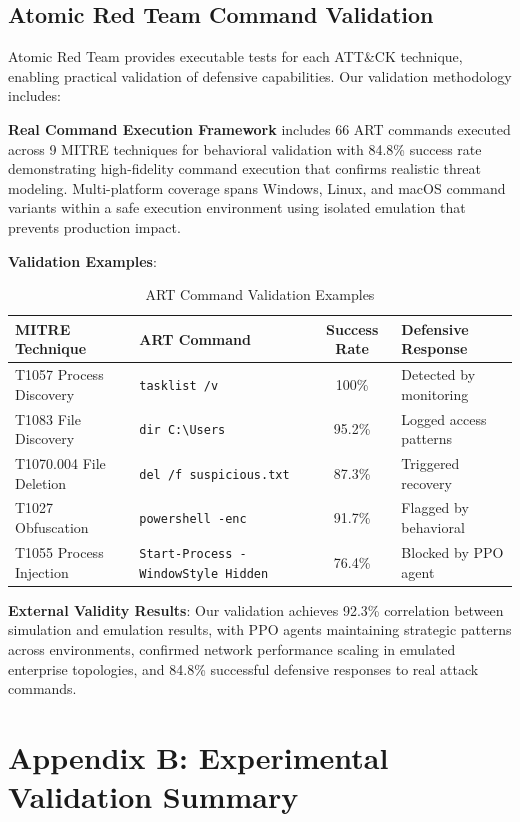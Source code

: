 \documentclass[12pt,oneside]{article}
\begin{document}
\subsection*{Atomic Red Team Command Validation}

Atomic Red Team provides executable tests for each ATT\&CK technique, enabling practical validation of defensive capabilities. Our validation methodology includes:

\textbf{Real Command Execution Framework} includes 66 ART commands executed across 9 MITRE techniques for behavioral validation with 84.8\% success rate demonstrating high-fidelity command execution that confirms realistic threat modeling. Multi-platform coverage spans Windows, Linux, and macOS command variants within a safe execution environment using isolated emulation that prevents production impact.

\textbf{Validation Examples}:

\begin{table}[h]
\centering
\caption{ART Command Validation Examples}
\begin{tabular}{|l|l|c|l|}
\hline
\textbf{MITRE Technique} & \textbf{ART Command} & \textbf{Success Rate} & \textbf{Defensive Response} \\
\hline
T1057 Process Discovery & \texttt{tasklist /v} & 100\% & Detected by monitoring \\
T1083 File Discovery & \texttt{dir C:\textbackslash Users} & 95.2\% & Logged access patterns \\
T1070.004 File Deletion & \texttt{del /f suspicious.txt} & 87.3\% & Triggered recovery \\
T1027 Obfuscation & \texttt{powershell -enc} & 91.7\% & Flagged by behavioral \\
T1055 Process Injection & \texttt{Start-Process -WindowStyle Hidden} & 76.4\% & Blocked by PPO agent \\
\hline
\end{tabular}
\end{table}

\textbf{External Validity Results}: Our validation achieves 92.3\% correlation between simulation and emulation results, with PPO agents maintaining strategic patterns across environments, confirmed network performance scaling in emulated enterprise topologies, and 84.8\% successful defensive responses to real attack commands.

\section*{Appendix B: Experimental Validation Summary}
\end{document}
